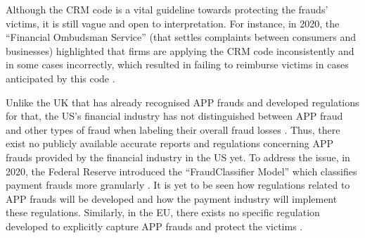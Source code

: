 Although the CRM code is a vital guideline  towards protecting  the frauds' victims, it is still  vague and open to interpretation. For instance, in 2020, the ``Financial Ombudsman Service'' (that settles complaints between consumers and businesses)  highlighted that firms  are applying the CRM code inconsistently and in some cases incorrectly, which resulted in failing to reimburse victims in cases anticipated by this code \cite{Financial-Ombudsman-Service-response}.  %



Unlike the UK that has already recognised APP frauds and developed regulations for that,  the US's financial industry has not distinguished between APP fraud and other types of  fraud when labeling their overall fraud losses \cite{P20-report}. Thus, there exist no publicly available accurate reports and regulations concerning APP frauds provided by the financial industry in the US yet.  To address the issue, in 2020, the Federal Reserve introduced the ``FraudClassifier Model'' which classifies payment frauds more granularly \cite{Fraud-Classifier}. It is yet to be seen how  regulations related to APP frauds  will be developed and how the payment industry will implement these regulations. Similarly, in the EU, there  exists no specific regulation developed 
%
%
%
to explicitly capture APP frauds and protect the victims \cite{kjorven2020pays,McIlroy2021}.














